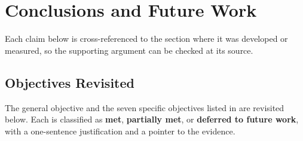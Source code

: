 \chapter{Conclusions and Future Work}
\label{ch:conclusions}

Each claim below is cross-referenced to the section where it was
developed or measured, so the supporting argument can be checked at its
source.

\section{Objectives Revisited}
\label{sec:conc-objectives}

The general objective and the seven specific objectives listed in
 are revisited below.
Each is classified as \textbf{met}, \textbf{partially met}, or
\textbf{deferred to future work}, with a one-sentence justification and
a pointer to the evidence.

